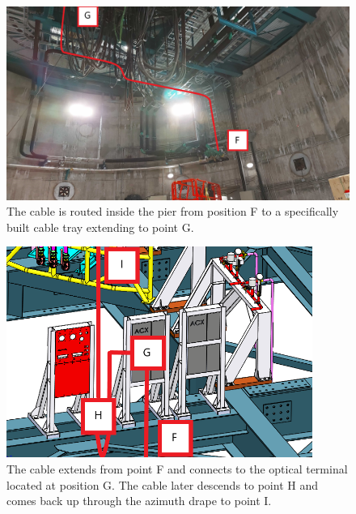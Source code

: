   \begin{figure}
    \centering
    \includegraphics[width=15cm]{images/19-1.jpg}
    \caption*{The cable is routed inside the pier from position F to a specifically built cable tray extending to point G.}
  \end{figure}
  \begin{figure}
    \centering
    \includegraphics[width=10cm]{images/21-1.png}
    \caption*{The cable extends from point F and connects to the optical terminal located at position G. The cable later descends to point H and comes back up through the azimuth drape to point I.}
  \end{figure}

\newpage


